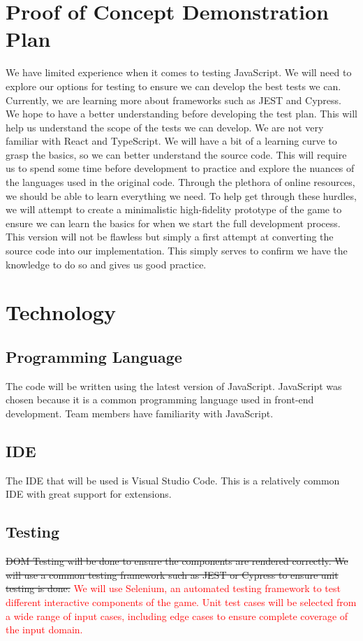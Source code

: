 \documentclass{article}
\begin{document}
	\section{Proof of Concept Demonstration Plan}
	We have limited experience when it comes to testing JavaScript. We will
	need to explore our options for testing to ensure we can develop the best
	tests we can. Currently, we are learning more about frameworks such as JEST
	and Cypress. We hope to have a better understanding before developing the
	test plan. This will help us understand the scope of the tests we can
	develop. We are not very familiar with React and TypeScript. We will have a
	bit of a learning curve to grasp the basics, so we can better understand
	the source code. This will require us to spend some time before development
	to practice and explore the nuances of the languages used in the original
	code. Through the plethora of online resources, we should be able to learn
	everything we need. To help get through these hurdles, we will attempt to
	create a minimalistic high-fidelity prototype of the game to ensure we can
	learn the basics for when we start the full development process. This
	version will not be flawless but simply a first attempt at converting the
	source code into our implementation. This simply serves to confirm we
	have the knowledge to do so and gives us good practice.
	
	\section{Technology}
	\subsection{Programming Language}
	The code will be written using the latest version of JavaScript. JavaScript 
	was 
	chosen because it is a common programming language used in front-end 
	development. Team members have familiarity with JavaScript.
	\subsection{IDE}
	The IDE that will be used is Visual Studio Code. This is a relatively 
	common 
	IDE with great support for extensions.
	\subsection{Testing}
	\st{DOM Testing will be done to ensure the components are rendered correctly. 
	We 
	will use a common testing framework such as JEST or Cypress to ensure unit 
	testing is done.}
	\textcolor{red}{We will use Selenium, an automated testing framework to test different interactive components of the game. Unit test cases will be selected from a wide range of input cases, including edge cases to ensure complete coverage of the input domain.}
\end{document}
